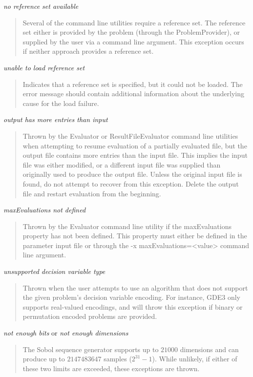 \noindent
\textit{no reference set available}
\begin{quote}
  Several of the command line utilities require a reference set.  The reference set either is provided by the problem (through the ProblemProvider), or supplied by the user via a command line argument.  This exception occurs
 if neither approach provides a reference set.
\end{quote}

\noindent
\textit{unable to load reference set}
\begin{quote}
  Indicates that a reference set is specified, but it could not be loaded. The error message should contain additional information about the underlying cause for the load failure.
\end{quote}

\noindent
\textit{output has more entries than input}
\begin{quote}
  Thrown by the Evaluator or ResultFileEvaluator command line utilities when attempting to resume evaluation of a partially evaluated file, but the output file contains more entries than the input file.  This implies the input file was either modified, or a different input file was supplied than originally used to produce the output file.  Unless the original input file is found, do not attempt to recover from this exception.  Delete the output file and restart evaluation from the beginning.
\end{quote}

\noindent
\textit{maxEvaluations not defined}
\begin{quote}
  Thrown by the Evaluator command line utility if the maxEvaluations property has not been defined.  This property must either be defined in the parameter input file or through the -x maxEvaluations=<value> command line argument.
\end{quote}

\noindent
\textit{unsupported decision variable type}
\begin{quote}
  Thrown when the user attempts to use an algorithm that does not support the given problem's decision variable encoding.  For instance, GDE3 only supports real-valued encodings, and will throw this exception if binary or permutation encoded problems are provided.
\end{quote}

\noindent
\textit{not enough bits} or
\textit{not enough dimensions}
\begin{quote}
  The Sobol sequence generator supports up to $21000$ dimensions and can produce up to $2147483647$ samples ($2^{31}-1$).  While unlikely, if either of these two limits are exceeded, these exceptions are thrown.
\end{quote}

